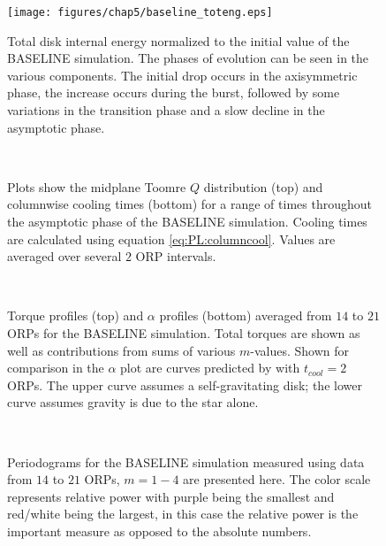 \begin{figure}[p]
\centering
\texttt{[image: figures/chap5/baseline\_toteng.eps]}
\caption[NEED TAGLINE]{Total disk internal energy normalized to the initial value of the BASELINE simulation. The phases of evolution can be seen in the various components. The initial drop occurs in the axisymmetric phase, the increase occurs during the burst, followed by some variations in the transition phase and a slow decline in the asymptotic phase.}
\label{fig:PL:engbaseline}
\end{figure}

\begin{figure}[p]
\centering
{}\\
\caption[NEED TAGLINE]{Plots show the midplane Toomre $Q$ distribution (top) and columnwise cooling times (bottom) for a range of times throughout the asymptotic phase of the BASELINE simulation. Cooling times are calculated using equation \eqref{eq:PL:columncool}. Values are averaged over several $2$ ORP intervals.}
\label{fig:PL:qbaseline}
\end{figure}

\begin{figure}[p]
\centering
{}\\
\caption[Torque and $\alpha$ measurement for the asymptotic phase of the BASELINE simulation]{Torque profiles (top) and $\alpha$ profiles (bottom) averaged from $14$ to $21$ ORPs for the BASELINE simulation. Total torques are shown as well as contributions from sums of various $m$-values. Shown for comparison in the $\alpha$ plot are curves predicted by \citeauthor{gammie2001} with $t_{cool} = 2$ ORPs. The upper curve assumes a self-gravitating disk; the lower curve assumes gravity is due to the star alone.}
\label{fig:PL:torquebaseline}
\end{figure}

\begin{figure}[p]
\centering
{}
\\
\caption[NEED TAGLINE]{Periodograms for the BASELINE simulation measured using data from $14$ to $21$ ORPs, $m = 1-4$ are presented here. The color scale represents relative power with purple being the smallest  and red/white being the largest, in this case the relative power is the important measure as opposed to the absolute numbers.}
\label{fig:PL:periodbaseline}
\end{figure}

